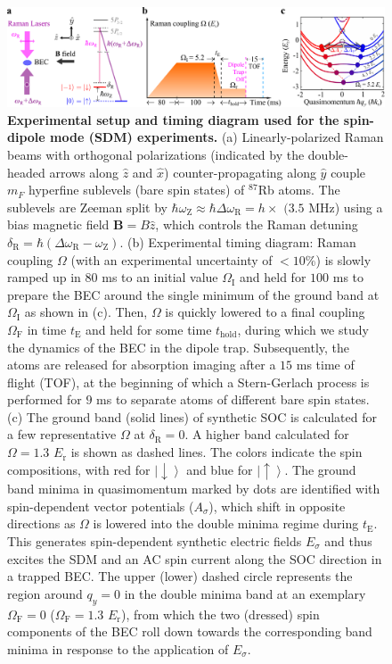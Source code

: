 \documentclass[showpacs,preprintnumbers,amsmath,amssymb, superscriptaddress, aps, reprint]{revtex4-1}
\def\E_r{E_{\text{r}}}
\def\deltaR{\delta_{\text{R}}}
\def\OmegaF{\Omega_{\text{F}}}
\def\OmegaI{\Omega_{\text{I}}}
\def\omegaR{\omega_{\text{R}}}
\def\omegaZ{\omega_{\text{Z}}}
\def\thold{t_{\text{hold}}}
\begin{document}
{\begin{figure}[!ht]
\centering
\includegraphics[width=7.0in]{Fig1_Setup_Vfinal.pdf}
\caption{\textbf{Experimental setup and timing diagram used for the spin-dipole mode (SDM) experiments.} (a) Linearly-polarized Raman beams with orthogonal polarizations (indicated by the double-headed arrows along $\hat{z}$ and $\hat{x}$) counter-propagating along $\hat{y}$ couple $m_F$ hyperfine sublevels (bare spin states) of $^{87}$Rb atoms. The sublevels are Zeeman split by $\hbar {\omegaZ} \approx \hbar \Delta {\omegaR} = h \times$ $(3.5$ MHz) using a bias magnetic field $\textbf{B}=B\hat{z}$, which controls the Raman detuning $\deltaR = \hbar (\Delta {\omegaR}-{\omegaZ})$. (b) Experimental timing diagram: Raman coupling $\Omega$ (with an experimental uncertainty of $<10$\%) is slowly ramped up in $80$ ms to an initial value $\OmegaI$ and held for $100$ ms to prepare the BEC around the single minimum of the ground band at $\OmegaI$ as shown in (c). Then, $\Omega$ is quickly lowered to a final coupling $\OmegaF$ in time $t_{\text{E}}$ and held for some time $\thold$, during which we study the dynamics of the BEC in the dipole trap. Subsequently, the atoms are released for absorption imaging after a $15$ ms time of flight (TOF), at the beginning of which a Stern-Gerlach process is performed for $9$ ms to separate atoms of different bare spin states. (c) The ground band (solid lines) of synthetic SOC is calculated for a few representative $\Omega$ {at $\deltaR=0$}. A higher band calculated for $\Omega = 1.3$ $\E_r$ is shown as dashed lines. The colors indicate the spin compositions, with red for $\left|\downarrow\right\rangle$ and blue for $\left|\uparrow\right\rangle$. The ground band minima in quasimomentum marked by dots are identified with spin-dependent vector potentials ($A_{\sigma}$), which shift in opposite directions as $\Omega$ is lowered into the double minima regime during $t_{\text{E}}$. This generates spin-dependent synthetic electric fields $E_{\sigma}$ and thus excites the SDM and an AC spin current along the SOC direction in a trapped BEC. The upper (lower) dashed circle represents the region around $q_y=0$ in the double minima band at an exemplary $\OmegaF=0$ ($\OmegaF=1.3$ $\E_r$), from which the two (dressed) spin components of the BEC roll down towards the corresponding band minima in response to the application of $E_{\sigma}$.}
\label{Fig1}
\end{figure}

}
\end{document}
